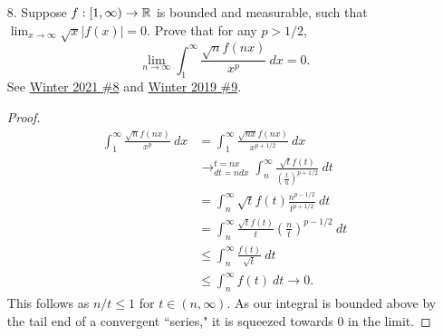 \begin{itemize}
\item[8.] Suppose $f : [1,\infty) \rightarrow \mathbb{R}$ is bounded and measurable, such that
$\lim_{x \rightarrow \infty} \sqrt{x}|f(x)| = 0$. Prove that for any $p > 1/2$,
$$\lim_{n \rightarrow \infty} \int_{1}^{\infty} \frac{\sqrt{n} f(nx)}{x^p} \ dx = 0.$$
\label{q:w21-8}
\label{q:w19-9a}
See \hyperref[q:w21-8]{Winter 2021 \#8} and \hyperref[q:w19-9b]{Winter 2019 \#9}.
\begin{proof}
\begin{align*}
    \int_{1}^{\infty} \frac{\sqrt{n} f(nx)}{x^p} \ dx &= \int_{1}^{\infty} \frac{\sqrt{nx} f(nx)}{x^{p+1/2}} \ dx \\
    &\rightarrow_{dt=n dx }^{t=nx} \int_{n}^{\infty} \frac{\sqrt{t} f(t)}{(\frac{t}{n})^{p+1/2}} \ dt \\ 
    &= \int_{n}^{\infty} \sqrt{t} f(t) \frac{n^{p-1/2}}{t^{p+1/2}} \ dt \\ 
    &= \int_{n}^{\infty} \frac{\sqrt{t} f(t)}{t} \left(\frac{n}{t}\right)^{p-1/2} \ dt \\ 
    &\leq \int_{n}^{\infty} \frac{f(t)}{\sqrt{t}} \ dt \\ 
    &\leq \int_{n}^{\infty} f(t) \ dt \rightarrow 0. 
\end{align*}
This follows as $n/t \leq 1$ for $t \in (n,\infty)$. As our integral is bounded above by the tail end of a convergent ``series," it is squeezed towards 0 in the limit.
\end{proof}





















\end{itemize}